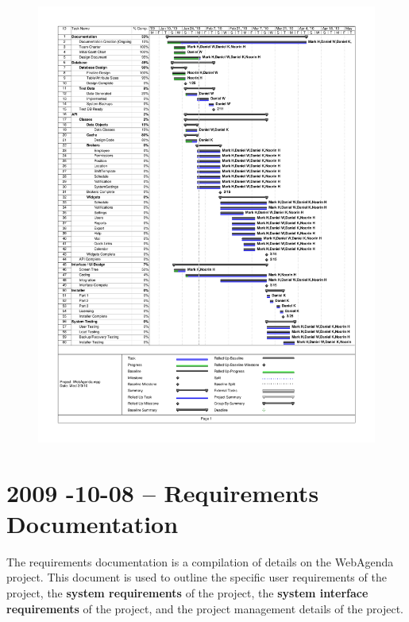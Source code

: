 \documentclass[letterpaper,12pt]{report}
\begin{document}
\begin{figure}[htp]
  \includegraphics[scale=0.9, trim=10mm 10mm 10mm 15mm]{externals/webagenda_gantt.pdf}
\label{fig:gantt1}
\end{figure}

\pagebreak

\section{2009 -10-08 – Requirements Documentation}
\hspace{1cm}The requirements documentation is a compilation of details on the WebAgenda project. This document is used to outline the specific user requirements of the project, the \textbf{system requirements} of the project, the \textbf{system interface requirements} of the project, and the project management details of the project.
\end{document}
